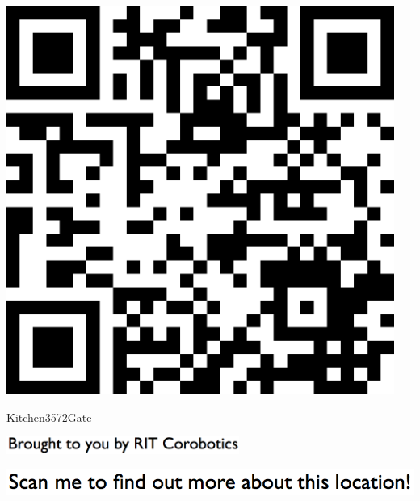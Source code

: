 \documentclass[letterpaper]{article}
\begin{document}
 \begingroup 
 \centerline{\includegraphics[scale=1,width=5in,height=5in]{Kitchen3572Gate.png}} 
 \endgroup 
 \vspace*{\fill} 

 \hfill{\small Kitchen3572Gate} 

  \vspace{0.7in} 
 
 \centerline{\includegraphics[scale=1,width=3in]{text-bottom.png}} 
 
 \pagebreak 
{} 
 \vspace*{\fill} 
 
  \centerline{\includegraphics[scale=1,width=6in]{text-top.png}} 
 
 \vspace{0.5in} 
 
\end{document}
